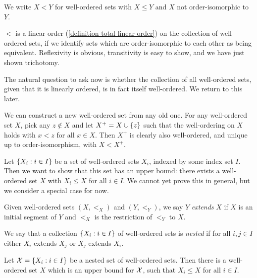 \documentclass{article}
\begin{document}
We write $X < Y$ for well-ordered sets with $X \leq Y$ and $X$ not order-isomorphic to $Y$.

\begin{corollary}
    $<$ is a linear order (\ref{definition-total-linear-order}) on the collection of well-ordered sets, if we identify sets which are order-isomorphic to each other as being equivalent. Reflexivity is obvious, transitivity is easy to show, and we have just shown trichotomy.
\end{corollary}

\begin{note}
	The natural question to ask now is whether the collection of all well-ordered sets, given that it is linearly ordered, is in fact itself well-ordered. We return to this later.
\end{note}

\begin{note}
	We can construct a new well-ordered set from any old one. For any well-ordered set $X$, pick any $z \notin X$ and let $X^+ = X \cup \left\lbrace z \right\rbrace$ such that the well-ordering on $X$ holds with $x < z$ for all $x \in X$. Then $X^+$ is clearly also well-ordered, and unique up to order-isomorphism, with $X < X^+$.
\end{note}

\begin{note}
	Let $\left\lbrace X_i : i \in I \right\rbrace$ be a set of well-ordered sets $X_i$, indexed by some index set $I$. Then we want to show that this set has an upper bound: there exists a well-ordered set $X$ with $X_i \leq X$ for all $i \in I$. We cannot yet prove this in general, but we consider a special case for now.
\end{note}

\begin{definition}
    Given well-ordered sets $(X, <_X)$ and $(Y, <_Y)$, we say $Y$ \textit{extends} $X$ if $X$ is an initial segment of $Y$ and $<_X$ is the restriction of $<_Y$ to $X$.
    
    We say that a collection $\left\lbrace X_i : i \in I \right\rbrace$ of well-ordered sets is \textit{nested} if for all $i, j \in I$ either $X_i$ extends $X_j$ or $X_j$ extends $X_i$.
\end{definition}

\begin{proposition}
	\label{nested-collection-upper-bound}
    Let $\mathcal{X} = \left\lbrace X_i : i \in I \right\rbrace$ be a nested set of well-ordered sets. Then there is a well-ordered set $X$ which is an upper bound for $\mathcal{X}$, such that $X_i \leq X$ for all $i \in I$.
\end{proposition}
\end{document}
